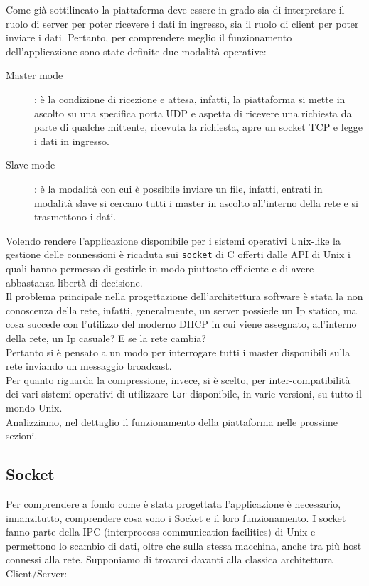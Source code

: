 \documentclass[11pt,fleqn]{book} %
\begin{document}
Come già sottilineato la piattaforma deve essere in grado sia di interpretare il ruolo di server per poter ricevere i dati in ingresso, sia il ruolo di client per poter inviare i dati. Pertanto, per comprendere meglio il funzionamento dell'applicazione sono state definite due modalità operative:
\medskip
\begin{description}
\item[Master mode] : è la condizione di ricezione e attesa, infatti, la piattaforma si mette in ascolto su una specifica porta UDP e aspetta di ricevere una richiesta da parte di qualche mittente, ricevuta la richiesta, apre un socket TCP e legge i dati in ingresso.
\item [Slave mode]: è la modalità con cui è possibile inviare un file, infatti, entrati in modalità slave si cercano tutti i master in ascolto all'interno della rete e si trasmettono i dati.
\end{description}

\medskip
\noindent Volendo rendere l'applicazione disponibile per i sistemi operativi Unix-like la gestione delle connessioni è ricaduta sui \texttt{socket} di C offerti dalle API di Unix i quali hanno permesso di gestirle in modo piuttosto efficiente e di avere abbastanza libertà di decisione.\\
\noindent Il problema principale nella progettazione dell'architettura software è stata la non conoscenza della rete, infatti, generalmente, un server possiede un Ip statico, ma cosa succede con l'utilizzo del moderno DHCP in cui viene assegnato, all'interno della rete, un Ip casuale? E se la rete cambia?\\
\noindent Pertanto si è pensato a un modo per interrogare tutti i master disponibili sulla rete inviando un messaggio broadcast.\\
\noindent Per quanto riguarda la compressione, invece, si è scelto, per inter-compatibilità dei vari sistemi operativi di utilizzare \texttt{tar} disponibile, in varie versioni, su tutto il mondo Unix.\\
\noindent Analizziamo, nel dettaglio il funzionamento della piattaforma nelle prossime sezioni.

\subsection{Socket}
Per comprendere a fondo come è stata progettata l'applicazione è necessario, innanzitutto, comprendere cosa sono i Socket e il loro funzionamento.
I socket fanno parte della IPC (interprocess communication facilities) di Unix e permettono lo scambio di dati, oltre che sulla stessa macchina, anche tra più host connessi alla rete. Supponiamo di trovarci davanti alla classica architettura Client/Server:
\medskip
\end{document}
